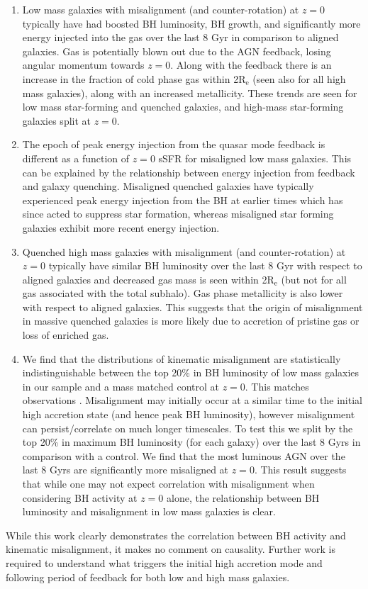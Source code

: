 \begin{enumerate}
    \item Low mass galaxies with misalignment (and counter-rotation) at $z=0$ typically have had boosted BH luminosity, BH growth, and significantly more energy injected into the gas over the last 8 Gyr in comparison to aligned galaxies. Gas is potentially blown out due to the AGN feedback, losing angular momentum towards $z=0$. Along with the feedback there is an increase in the fraction of cold phase gas within 2$\mathrm{R_{e}}$ (seen also for all high mass galaxies), along with an increased metallicity. These trends are seen for low mass star-forming and quenched galaxies, and high-mass star-forming galaxies split at $z=0$.
    
    \item The epoch of peak energy injection from the quasar mode feedback is different as a function of $z=0$ sSFR for misaligned low mass galaxies. This can be explained by the relationship between energy injection from feedback and galaxy quenching. Misaligned quenched galaxies have typically experienced peak energy injection from the BH at earlier times which has since acted to suppress star formation, whereas misaligned star forming galaxies exhibit more recent energy injection.

    \item Quenched high mass galaxies with misalignment (and counter-rotation) at $z=0$ typically have similar BH luminosity over the last 8 Gyr with respect to aligned galaxies and decreased gas mass is  seen within 2$\mathrm{R_{e}}$ (but not for all gas associated with the total subhalo). Gas phase metallicity is also lower with respect to aligned galaxies. This suggests that the origin of misalignment in massive quenched galaxies is more likely due to accretion of pristine gas or loss of enriched gas. 
    
    \item We find that the distributions of kinematic misalignment are statistically indistinguishable between the top 20\% in BH luminosity of low mass galaxies in our sample and a mass matched control at $z=0$. This matches observations \citep[see Figure 6 in][]{ilha2019}. Misalignment may initially occur at a similar time to the initial high accretion state (and hence peak BH luminosity), however misalignment can persist/correlate on much longer timescales. To test this we split by the top 20\% in maximum BH luminosity (for each galaxy) over the last 8 Gyrs in comparison with a control. We find that the most luminous AGN over the last 8 Gyrs are significantly more misaligned at $z=0$. This result suggests that while one may not expect correlation with misalignment when considering BH activity at $z=0$ alone, the relationship between BH luminosity and misalignment in low mass galaxies is clear. 
\end{enumerate}
While this work clearly demonstrates the correlation between BH activity and kinematic misalignment, it makes no comment on causality. Further work is required to understand what triggers the initial high accretion mode and following period of feedback for both low and high mass galaxies.

